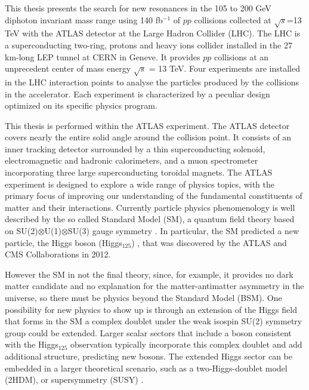 \documentclass[a4paper, oneside, 11pt]{book}
\begin{document}
	This thesis presents the search for new resonances in the 105 to 200 GeV diphoton invariant mass range using 140 fb$^{-1}$ of $pp$ collisions collected at $\sqrt{s}$=13 TeV with the ATLAS detector at the Large Hadron Collider (LHC). The LHC \cite{LHC_DESIGN_2004,LHC_DESIGN_2008} is a superconducting two-ring, protons and heavy ions collider installed in the 27 km-long LEP \cite{LEP_DESIGN_2001} tunnel at CERN in Geneve. It provides $pp$ collisions at an unprecedent center of mass energy $\sqrt{s}$ = 13 TeV. Four experiments are installed in the LHC interaction points to analyse the particles produced by the collisions in the accelerator. Each experiment is characterized by a peculiar design optimized on its specific physics program.
	
	This thesis is performed within the ATLAS \cite{ATLAS_DESIGN_2008} experiment. The ATLAS detector covers nearly the entire solid angle around the collision point. It consists of an inner tracking detector surrounded by a thin superconducting solenoid, electromagnetic and hadronic calorimeters, and a muon spectrometer incorporating three large superconducting toroidal magnets. The ATLAS experiment is designed to explore a wide range of physics topics, with the primary focus of improving our understanding of the fundamental constituents of matter and their interactions. Currently particle physics phenomenology is well described by the so called Standard Model (SM), a quantum field theory based on SU(2)$\otimes$U(1)$\otimes$SU(3) gauge symmetry \cite{weinberg_1995}. In particular, the SM predicted a new particle, the Higgs boson (Higgs$_{125}$) \cite{higgs_atlas,higgs_cms}, that was discovered by the ATLAS and CMS Collaborations in 2012.
	
	However the SM in not the final theory, since, for example, it provides no dark matter candidate and no explanation for the matter-antimatter asymmetry in the universe, so there must be physics beyond the Standard Model (BSM). One possibility for new physics to show up is through an extension of the Higgs field that forms in the SM a complex doublet under the weak isospin SU(2) symmetry group could be extended. Larger scalar sectors that include a boson consistent with the Higgs$_{125}$ observation typically incorporate this complex doublet and add additional structure, predicting new bosons. The extended Higgs sector can be embedded in a larger theoretical scenario, such as a two-Higgs-doublet model (2HDM)\cite{Branco_2012}, or supersymmetry (SUSY) \cite{dine_2016}.
	
\end{document}
